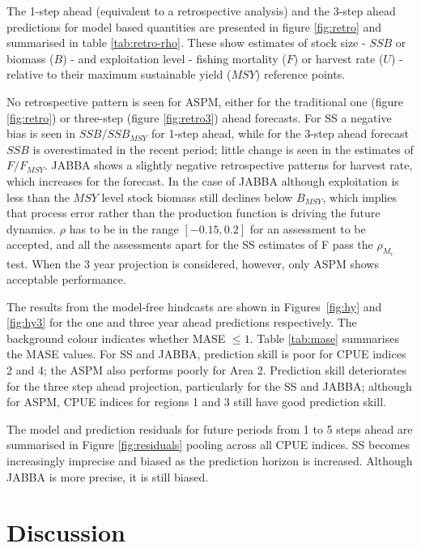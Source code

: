 \documentclass[12pt,halfline,a4paper,nonumbib]{ouparticle}
\begin{document}
The 1-step ahead (equivalent to a retrospective analysis) and the 3-step ahead predictions for model based quantities are presented in figure \ref{fig:retro} and summarised in table \ref{tab:retro-rho}. These show estimates of stock size - $SSB$ or biomass ($B$) - and exploitation level - fishing mortality ($F$) or harvest rate ($U$) - relative to their maximum sustainable yield ($MSY$) reference points.

No retrospective pattern is seen for ASPM, either for the traditional one (figure \ref{fig:retro}) or three-step (figure \ref{fig:retro3})  ahead forecasts. For SS a negative bias is seen in $SSB/SSB_{MSY}$ for 1-step ahead, while for the 3-step ahead forecast $SSB$ is overestimated in the recent period; little change is seen in the estimates of $F/F_{MSY}$. JABBA shows a slightly negative retrospective patterns for harvest rate, which increases for the forecast. In the case of JABBA although exploitation is less than the ${MSY}$ level stock biomass still declines below $B_{MSY}$, which implies that process error rather than the production function is driving the future dynamics. $\rho$ has to be in the range $[-0.15,0.2]$ for an assessment to be accepted, and all the assessments apart for the SS estimates of F pass the $\rho_{M_r}$ test. When the 3 year projection is considered, however, only ASPM shows acceptable performance. 

The results from the model-free hindcasts are shown in Figures~\ref{fig:hy} and \ref{fig:hy3} for the one and three year ahead predictions respectively. The background colour indicates whether MASE $\le 1$. Table \ref{tab:mase} summarises the MASE values. For SS and JABBA, prediction skill is poor for CPUE indices 2 and 4; the ASPM also performs poorly for Area 2. Prediction skill deteriorates for the three step ahead projection, particularly for the SS and JABBA; although for ASPM, CPUE indices for regions 1 and 3 still have good prediction skill. 

The model and prediction residuals for future periods from 1 to 5 steps ahead are summarised in Figure \ref{fig:residuals} pooling across all CPUE indices. SS becomes increasingly imprecise and biased as the prediction horizon is increased. Although JABBA is more precise, it is still biased.

\section{Discussion}
\end{document}
